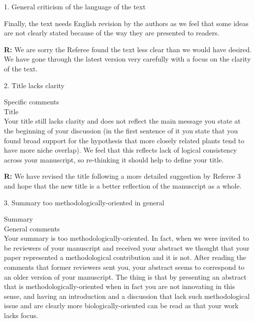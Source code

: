 \documentclass[12pt]{letter}
\newenvironment{refquote}{\bigskip \begin{it}}{\end{it}\smallskip}
\begin{document}
	1. General criticism of the language of the text

		\begin{refquote}

		Finally, the text needs English revision by the authors as we feel that some ideas are not clearly stated because of the way they are presented to readers. 

		\end{refquote}


		\textbf{R:} 
		We are sorry the Referee found the text less clear than we would have desired. We have gone through the latest version very carefully with a focus on the clarity of the text.
		


	2. Title lacks clarity

		\begin{refquote}
		Specific comments\\
		Title\\
		Your title still lacks clarity and does not reflect the main message you state at the beginning of your discussion (in the first sentence of it you state that you found broad support for the hypothesis that more closely related plants tend to have more niche overlap). We feel that this reflects lack of logical consistency across your manuscript, so re-thinking it should help to define your title.
		\end{refquote}

		\textbf{R:} We have revised the title following a more detailed suggestion by Referee 3 and hope that the new title is a better reflection of the manuscript as a whole.


	3. Summary too methodologically-oriented in general

		\begin{refquote}
			Summary\\
			General comments\\
			Your summary is too methodologically-oriented. In fact, when we were invited to be reviewers of your manuscript and received your abstract we thought that your paper represented a methodological contribution and it is not. After reading the comments that former reviewers sent you, your abstract seems to correspond to an older version of your manuscript. The thing is that by presenting an abstract that is methodologically-oriented when in fact you are not innovating in this sense, and having an introduction and a discussion that lack such methodological issue and are clearly more biologically-oriented can be read as that your work lacks focus.
		\end{refquote}
\end{document}
